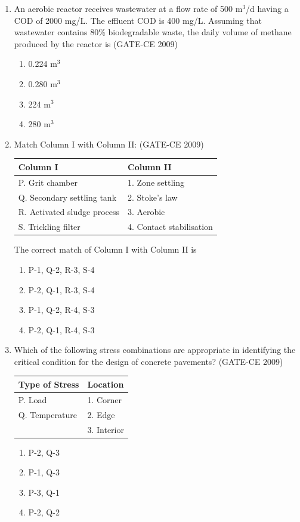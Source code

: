 \documentclass[journal,12pt,onecolumn]{article}
\theoremstyle{remark}
\begin{document}
\begin{enumerate}
    \item An aerobic reactor receives wastewater at a flow rate of 500 m$^3$/d having a COD of 2000 mg/L. The effluent COD is 400 mg/L. Assuming that wastewater contains 80\% biodegradable waste, the daily volume of methane produced by the reactor is (GATE-CE 2009)
    \begin{enumerate}
        \item 0.224 m$^3$ 
        \item 0.280 m$^3$ 
        \item 224 m$^3$ 
        \item 280 m$^3$
    \end{enumerate}
    
    \item Match Column I with Column II: (GATE-CE 2009)
    \begin{center}
    \begin{tabular}{|l|l|}
    \hline
    \textbf{Column I} & \textbf{Column II} \\
    \hline
    P. Grit chamber & 1. Zone settling \\
    Q. Secondary settling tank & 2. Stoke's law \\
    R. Activated sludge process & 3. Aerobic \\
    S. Trickling filter & 4. Contact stabilisation \\
    \hline
    \end{tabular}
    \end{center}
    The correct match of Column I with Column II is
    \begin{enumerate}
        \item P-1, Q-2, R-3, S-4 
        \item P-2, Q-1, R-3, S-4 
        \item P-1, Q-2, R-4, S-3 
        \item P-2, Q-1, R-4, S-3
    \end{enumerate}
    
    \item Which of the following stress combinations are appropriate in identifying the critical condition for the design of concrete pavements? (GATE-CE 2009)
    \begin{center}
    \begin{tabular}{|l|l|}
    \hline
    \textbf{Type of Stress} & \textbf{Location} \\
    \hline
    P. Load & 1. Corner \\
    Q. Temperature & 2. Edge \\
    & 3. Interior \\
    \hline
    \end{tabular}
    \end{center}
    \begin{enumerate}
        \item P-2, Q-3 
        \item P-1, Q-3 
        \item P-3, Q-1 
        \item P-2, Q-2
    \end{enumerate}
    

\end{enumerate}
\end{document}
